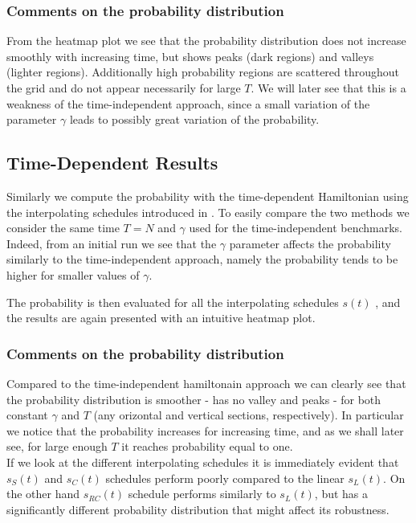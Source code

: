         \subsubsection*{Comments on the probability distribution}
        From the heatmap plot we see that the probability distribution does not increase smoothly with increasing time, but shows peaks (dark regions) and valleys (lighter regions). Additionally high probability regions are scattered throughout the grid and do not appear necessarily for large $T$. We will later see that this is a weakness of the time-independent approach, since a small variation of the parameter $\gamma$ leads to possibly great variation of the probability.

    \subsection{Time-Dependent Results}\label{subsec:time_dependent_results}
        Similarly we compute the probability with the time-dependent Hamiltonian using the interpolating schedules introduced in . To easily compare the two methods we consider the same time $T=N$ and $\gamma$ used for the time-independent benchmarks. Indeed, from an initial run we see that the $\gamma$ parameter affects the probability similarly to the time-independent approach, namely the probability tends to be higher for smaller values of $\gamma$. \\

        The probability is then evaluated for all the interpolating schedules $s(t)$ , and the results are again presented with an intuitive heatmap plot.


        \subsubsection*{Comments on the probability distribution}
        Compared to the time-independent hamiltonain approach we can clearly see that the probability distribution is smoother - has no valley and peaks - for both constant $\gamma$ and $T$ (any orizontal and vertical sections, respectively). In particular we notice that the probability increases for increasing time, and as we shall later see, for large enough $T$ it reaches probability equal to one.\\ If we look at the different interpolating schedules it is immediately evident that $s_S(t)$ and $s_C(t)$ schedules perform poorly compared to the linear $s_L(t)$. On the other hand $s_{RC}(t)$ schedule performs similarly to $s_L(t)$, but has a significantly different probability distribution  that might affect its robustness.

